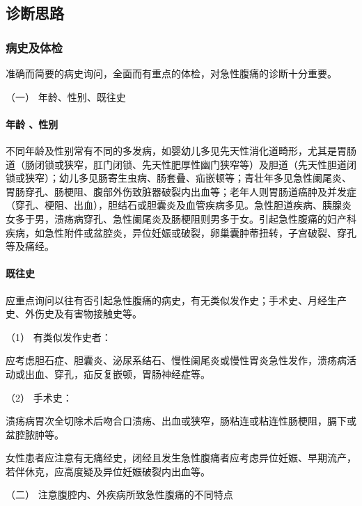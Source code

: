 \subsection{诊断思路}

\subsubsection{病史及体检}

准确而简要的病史询问，全面而有重点的体检，对急性腹痛的诊断十分重要。

\hypertarget{text00026.htmlux5cux23CHP1-10-2-1-1}{}
（一） 年龄、性别、既往史

\paragraph{年龄 、性别}

不同年龄及性别常有不同的多发病，如婴幼儿多见先天性消化道畸形，尤其是胃肠道（肠闭锁或狭窄，肛门闭锁、先天性肥厚性幽门狭窄等）及胆道（先天性胆道闭锁或狭窄）；幼儿多见肠寄生虫病、肠套叠、疝嵌顿等；青壮年多见急性阑尾炎、胃肠穿孔、肠梗阻、腹部外伤致脏器破裂内出血等；老年人则胃肠道癌肿及并发症（穿孔、梗阻、出血），胆结石或胆囊炎及血管疾病多见。急性胆道疾病、胰腺炎女多于男，溃疡病穿孔、急性阑尾炎及肠梗阻则男多于女。引起急性腹痛的妇产科疾病，如急性附件或盆腔炎，异位妊娠或破裂，卵巢囊肿蒂扭转，子宫破裂、穿孔等及痛经。

\paragraph{既往史}

应重点询问以往有否引起急性腹痛的病史，有无类似发作史；手术史、月经生产史、外伤史及有害物接触史等。

\hypertarget{text00026.htmlux5cux23CHP1-10-2-1-1-2-1}{}
（1） 有类似发作史者：

应考虑胆石症、胆囊炎、泌尿系结石、慢性阑尾炎或慢性胃炎急性发作，溃疡病活动或出血、穿孔，疝反复嵌顿，胃肠神经症等。

\hypertarget{text00026.htmlux5cux23CHP1-10-2-1-1-2-2}{}
（2） 手术史：

溃疡病胃次全切除术后吻合口溃疡、出血或狭窄，肠粘连或粘连性肠梗阻，膈下或盆腔脓肿等。

女性患者应注意有无痛经史，闭经且发生急性腹痛者应考虑异位妊娠、早期流产，若伴休克，应高度疑及异位妊娠破裂内出血等。

\hypertarget{text00026.htmlux5cux23CHP1-10-2-1-2}{}
（二） 注意腹腔内、外疾病所致急性腹痛的不同特点

